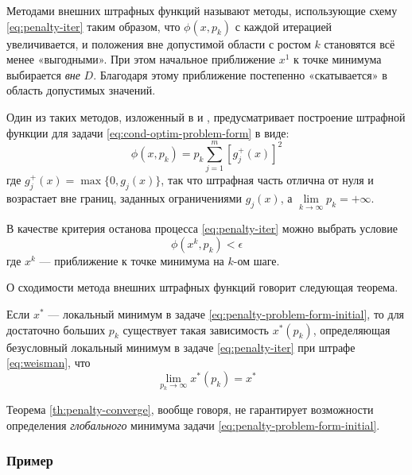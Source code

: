 Методами внешних штрафных функций называют методы, использующие схему
\eqref{eq:penalty-iter} таким образом, что $\phi(x, p_k)$ с каждой
итерацией увеличивается, и положения вне допустимой области с ростом
$k$ становятся всё менее «выгодными». При этом начальное приближение
$x^1$ к точке минимума выбирается \emph{вне} $D$. Благодаря этому
приближение постепенно «скатывается» в область допустимых значений.

Один из таких методов, изложенный в \cite{himmelblau75} и
\cite{gill81}, предусматривает построение штрафной функции для задачи
\eqref{eq:cond-optim-problem-form} в виде:
\begin{equation}
  \label{eq:weisman}
  \phi(x, p_k) = p_k \sum_{j=1}^m{ \left [ g_j^+(x) \right ]^2}
\end{equation}
где $g_j^+(x) = \max\{0, g_j(x)\}$, так что штрафная часть отлична от
нуля и возрастает вне границ, заданных ограничениями $g_j(x)$, а
$\lim\limits_{k\to\infty}{p_k} = +\infty$.

В качестве критерия останова процесса \eqref{eq:penalty-iter} можно
выбрать условие
\begin{equation*}
  \phi(x^k, p_k) < \epsilon
\end{equation*}
где $x^k$ — приближение к точке минимума на $k$-ом шаге.

О сходимости метода внешних штрафных функций говорит следующая
теорема.
\begin{thm}
  \label{th:penalty-converge}
  Если $x^*$ — локальный минимум в задаче
  \eqref{eq:penalty-problem-form-initial}, то для достаточно больших
  $p_k$ существует такая зависимость $x^*(p_k)$, определяющая
  безусловный локальный минимум в задаче \eqref{eq:penalty-iter} при
  штрафе \eqref{eq:weisman}, что
  \begin{equation}
    \lim_{p_k \to \infty}{x^*(p_k)} = x^*
  \end{equation}
\end{thm}

\begin{rem}
  \label{rem:penalty-convex-is-good}
  Теорема \eqref{th:penalty-converge}, вообще говоря, не гарантирует
  возможности определения \emph{глобального} минимума задачи
  \eqref{eq:penalty-problem-form-initial}.
\end{rem}

\subsubsection{Пример}
\label{sec:penalty-usage}

